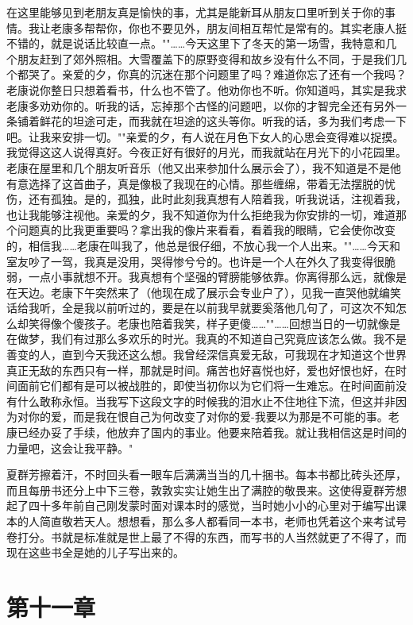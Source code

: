 \documentclass[UTF8]{ctexart}
\begin{document}
在这里能够见到老朋友真是愉快的事，尤其是能新耳从朋友口里听到关于你的事情。我让老康多帮帮你，你也不要见外，朋友间相互帮忙是常有的。其实老康人挺不错的，就是说话比较直一点。""……今天这里下了冬天的第一场雪，我特意和几个朋友赶到了郊外照相。大雪覆盖下的原野变得和故乡没有什么不同，于是我们几个都哭了。亲爱的夕，你真的沉迷在那个问题里了吗？难道你忘了还有一个我吗？老康说你整日只想着看书，什么也不管了。他劝你也不听。你知道吗，其实是我求老康多劝劝你的。听我的话，忘掉那个古怪的问题吧，以你的才智完全还有另外一条铺着鲜花的坦途可走，而我就在坦途的这头等你。听我的话，多为我们考虑一下吧。让我来安排一切。""亲爱的夕，有人说在月色下女人的心思会变得难以捉摸。我觉得这这人说得真好。今夜正好有很好的月光，而我就站在月光下的小花园里。老康在屋里和几个朋友听音乐（他又出来参加什么展示会了），我不知道是不是他有意选择了这首曲子，真是像极了我现在的心情。那些缠绵，带着无法摆脱的忧伤，还有孤独。是的，孤独，此时此刻我真想有人陪着我，听我说话，注视着我，也让我能够注视他。亲爱的夕，我不知道你为什么拒绝我为你安排的一切，难道那个问题真的比我更重要吗？拿出我的像片来看看，看着我的眼睛，它会使你改变的，相信我……老康在叫我了，他总是很仔细，不放心我一个人出来。""……今天和室友吵了一驾，我真是没用，哭得惨兮兮的。也许是一个人在外久了我变得很脆弱，一点小事就想不开。我真想有个坚强的臂膀能够依靠。你离得那么远，就像是在天边。老康下午突然来了（他现在成了展示会专业户了），见我一直哭他就编笑话给我听，全是我以前听过的，要是在以前我早就要奚落他几句了，可这次不知怎么却笑得像个傻孩子。老康也陪着我笑，样子更傻……""……回想当日的一切就像是在做梦，我们有过那么多欢乐的时光。我真的不知道自己究竟应该怎么做。我不是善变的人，直到今天我还这么想。我曾经深信真爱无敌，可我现在才知道这个世界真正无敌的东西只有一样，那就是时间。痛苦也好喜悦也好，爱也好恨也好，在时间面前它们都有是可以被战胜的，即使当初你以为它们将一生难忘。在时间面前没有什么敢称永恒。当我写下这段文字的时候我的泪水止不住地往下流，但这并非因为对你的爱，而是我在恨自己为何改变了对你的爱-我要以为那是不可能的事。老康已经办妥了手续，他放弃了国内的事业。他要来陪着我。就让我相信这是时间的力量吧，这会让我平静。"

夏群芳擦着汗，不时回头看一眼车后满满当当的几十捆书。每本书都比砖头还厚，而且每册书还分上中下三卷，敦敦实实让她生出了满腔的敬畏来。这使得夏群芳想起了四十多年前自己刚发蒙时面对课本时的感觉，当时她小小的心里对于编写出课本的人简直敬若天人。想想看，那么多人都看同一本书，老师也凭着这个来考试号卷打分。书就是标准就是世上最了不得的东西，而写书的人当然就更了不得了，而现在这些书全是她的儿子写出来的。
\clearpage

\section*{第十一章}
\end{document}
